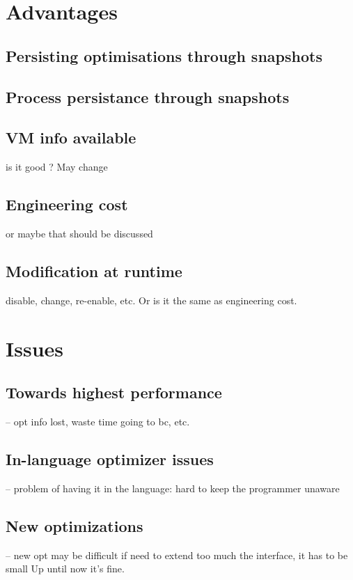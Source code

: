 \documentclass[a4paper,12pt,twoside]{../includes/ThesisStyle}
\begin{document}
\section{Advantages}

\subsection{Persisting optimisations through snapshots}

\subsection{Process persistance through snapshots}

\subsection{VM info available}

is it good ? May change

\subsection{Engineering cost}

or maybe that should be discussed

\subsection{Modification at runtime}

disable, change, re-enable, etc.
Or is it the same as engineering cost.

\section{Issues}

\subsection{Towards highest performance}
-- opt info lost, waste time going to bc, etc.

\subsection{In-language optimizer issues}
-- problem of having it in the language: hard to keep the programmer unaware

\subsection{New optimizations}
-- new opt may be difficult if need to extend too much the interface, it has to be small
Up until now it's fine.

\ifx\wholebook\relax\else
    
\end{document}
